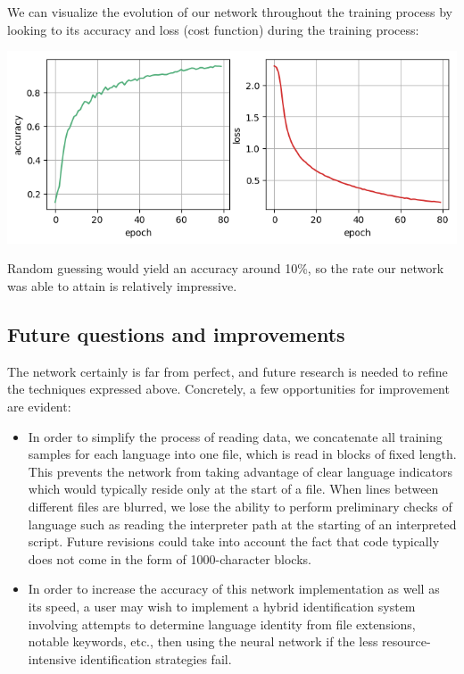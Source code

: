 \documentclass{article}
\begin{document}
We can visualize the evolution of our network throughout the training process by looking to its accuracy and loss (cost function) during the training process:

\begin{center}
    \includegraphics{history}
\end{center}

Random guessing would yield an accuracy around 10\%, so the rate our network was able to attain is relatively impressive.

\subsection{Future questions and improvements}
The network certainly is far from perfect, and future research is needed to refine the techniques expressed above. Concretely, a few opportunities for improvement are evident:
\begin{itemize}
    \item{In order to simplify the process of reading data, we concatenate all training samples for each language into one file, which is read in blocks of fixed length. This prevents the network from taking advantage of clear language indicators which would typically reside only at the start of a file. When lines between different files are blurred, we lose the ability to perform preliminary checks of language such as reading the interpreter path at the starting of an interpreted script. Future revisions could take into account the fact that code typically does not come in the form of 1000-character blocks.}
  \item{In order to increase the accuracy of this network implementation as well as its speed, a user may wish to implement a hybrid identification system involving attempts to determine language identity from file extensions, notable keywords, etc., then using the neural network if the less resource-intensive identification strategies fail.}
\end{itemize}
\end{document}
